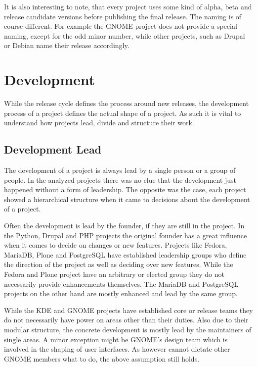 It is also interesting to note, that every project uses some kind of alpha,
beta and release candidate versions before publishing the final release. The
naming is of course different. For example the GNOME project does not provide a
special naming, except for the odd minor number, while other projects, such as
Drupal or Debian name their release accordingly.



\section{Development} %

While the release cycle defines the process around new releases, the
development process of a project defines the actual shape of a project. As such
it is vital to understand how projects lead, divide and structure their work.

\subsection{Development Lead} %

The development of a project is always lead by a single person or a group of
people. In the analyzed projects there was no clue that the development just
happened without a form of leadership. The opposite was the case, each project
showed a hierarchical structure when it came to decisions about the development
of a project.

Often the development is lead by the founder, if they are still in the project.
In the Python, Drupal and PHP projects the original founder has a great
influence when it comes to decide on changes or new features. Projects like
Fedora, MariaDB, Plone and PostgreSQL have established leadership groups who
define the direction of the project as well as deciding over new features.
While the Fedora and Plone project have an arbitrary or elected group they do
not necessarily provide enhancements themselves. The MariaDB and PostgreSQL
projects on the other hand are mostly enhanced and lead by the same group.

While the KDE and GNOME projects have established core or release teams they do
not necessarily have power on areas other than their duties. Also due to their
modular structure, the concrete development is mostly lead by the maintainers
of single areas. A minor exception might be GNOME's design team which is
involved in the shaping of user interfaces. As however cannot dictate other
GNOME members what to do, the above assumption still holds.

